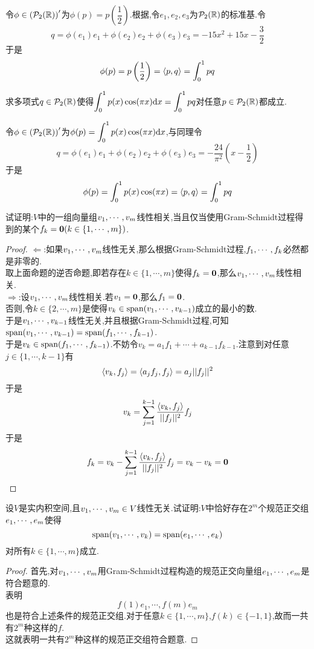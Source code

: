 \documentclass{ctexart}
\begin{document}
\begin{solution}
    令$\phi\in\left(\mathcal{P}_2(\mathbb{R})\right)'$为$\phi(p)=p\left(\dfrac12\right)$.根据,令$e_1,e_2,e_3$为$\mathcal{P}_2(\mathbb{R})$的标准基.令
    \[q=\phi(e_1)e_1+\phi(e_2)e_2+\phi(e_3)e_3=-15x^2+15x-\dfrac32\]
    于是
    \[\phi(p)=p\left(\dfrac12\right)=\left\langle{p},{q}\right\rangle=\int_0^1 pq\]
\end{solution}
\begin{problem}[12.]
    求多项式$q\in\mathcal{P}_2(\mathbb{R})$使得$\displaystyle\int_0^1p(x)\cos(\pi x)\mathrm{d} x=\int_0^1pq$对任意$p\in\mathcal{P}_2(\mathbb{R})$都成立.
\end{problem}
\begin{solution}
    令$\phi\in\left(\mathcal{P}_2(\mathbb{R})\right)'$为$\phi(p)=\displaystyle\int_0^1p(x)\cos(\pi x)\mathrm{d} x$,与同理令
    \[q=\phi(e_1)e_1+\phi(e_2)e_2+\phi(e_3)e_3=-\dfrac{24}{\pi^2}\left(x-\dfrac12\right)\]
    于是
    \[\phi(p)=\int_0^1p(x)\cos(\pi x)=\left\langle{p},{q}\right\rangle=\int_0^1 pq\]
\end{solution}
\begin{problem}[13.]
    试证明:$V$中的一组向量组${v}_1,\cdots,{v}_{m}$线性相关,当且仅当使用Gram-Schmidt过程得到的某个$f_k=\mathbf0(k\in\{1,\cdots,m\})$.
\end{problem}
\begin{proof}
    $\Leftarrow$:如果${v}_1,\cdots,{v}_{m}$线性无关,那么根据Gram-Schmidt过程,${f}_1,\cdots,{f}_{k}$必然都是非零的.\\
    取上面命题的逆否命题,即若存在$k\in\{1,\cdots,m\}$使得$f_k=\mathbf0$,那么${v}_1,\cdots,{v}_{m}$线性相关.\\
    $\Rightarrow$:设${v}_1,\cdots,{v}_{m}$线性相关.若$v_1=\mathbf0$,那么$f_1=\mathbf0$.\\
    否则,令$k\in\{2,\cdots,m\}$是使得$v_k\in\text{span}({v}_1,\cdots,{v}_{k-1})$成立的最小的数.\\
    于是${v}_1,\cdots,{v}_{k-1}$线性无关,并且根据Gram-Schmidt过程,可知$\text{span}({v}_1,\cdots,{v}_{k-1})=\text{span}({f}_1,\cdots,{f}_{k-1})$.\\
    于是$v_k\in\text{span}({f}_1,\cdots,{f}_{k-1})$.不妨令$v_k=a_1f_1+\cdots+a_{k-1}f_{k-1}$.注意到对任意$j\in\{1,\cdots,k-1\}$有
    \[\left\langle{v_k},{f_j}\right\rangle=\left\langle{a_jf_j},{f_j}\right\rangle=a_j||f_j||^2\]
    于是
    \[v_k=\sum_{j=1}^{k-1}\dfrac{\left\langle{v_k},{f_j}\right\rangle}{||f_j||^2}f_j\]
    于是
    \[f_k=v_k-\sum_{j=1}^{k-1}\dfrac{\left\langle{v_k},{f_j}\right\rangle}{||f_j||^2}f_j=v_k-v_k=\mathbf0\]
\end{proof}
\begin{problem}[14.]
    设$V$是实内积空间,且${v}_1,\cdots,{v}_{m}\in V$线性无关.试证明:$V$中恰好存在$2^m$个规范正交组${e}_1,\cdots,{e}_{m}$使得
    \[\text{span}({v}_1,\cdots,{v}_{k})=\text{span}({e}_1,\cdots,{e}_{k})\]
    对所有$k\in\{1,\cdots,m\}$成立.
\end{problem}
\begin{proof}
    首先,对${v}_1,\cdots,{v}_{m}$用Gram-Schmidt过程构造的规范正交向量组${e}_1,\cdots,{e}_{m}$是符合题意的.\\
    表明
    \[f(1)e_1,\cdots,f(m)e_m\]
    也是符合上述条件的规范正交组.对于任意$k\in\{1,\cdots,m\}$,$f(k)\in\{-1,1\}$,故而一共有$2^m$种这样的$f$.\\
    这就表明一共有$2^m$种这样的规范正交组符合题意.
\end{proof}
\end{document}
